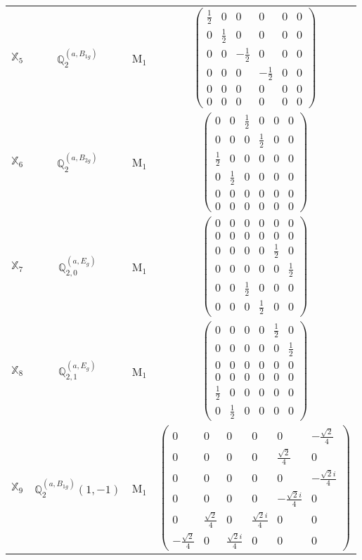 \documentclass[fleqn,10pt,landscape]{article}
\begin{document}
\begin{itemize}
\begin{center}
\begin{longtable}{c|c|c|c}
$ \mathbb{X}_{5} $ & $\mathbb{Q}_{2}^{(a,B_{1g})}$ & M$_{1}$ & $\begin{pmatrix} \frac{1}{2} & 0 & 0 & 0 & 0 & 0 \\ 0 & \frac{1}{2} & 0 & 0 & 0 & 0 \\ 0 & 0 & - \frac{1}{2} & 0 & 0 & 0 \\ 0 & 0 & 0 & - \frac{1}{2} & 0 & 0 \\ 0 & 0 & 0 & 0 & 0 & 0 \\ 0 & 0 & 0 & 0 & 0 & 0 \end{pmatrix}$ \\
$ \mathbb{X}_{6} $ & $\mathbb{Q}_{2}^{(a,B_{2g})}$ & M$_{1}$ & $\begin{pmatrix} 0 & 0 & \frac{1}{2} & 0 & 0 & 0 \\ 0 & 0 & 0 & \frac{1}{2} & 0 & 0 \\ \frac{1}{2} & 0 & 0 & 0 & 0 & 0 \\ 0 & \frac{1}{2} & 0 & 0 & 0 & 0 \\ 0 & 0 & 0 & 0 & 0 & 0 \\ 0 & 0 & 0 & 0 & 0 & 0 \end{pmatrix}$ \\
$ \mathbb{X}_{7} $ & $\mathbb{Q}_{2,0}^{(a,E_{g})}$ & M$_{1}$ & $\begin{pmatrix} 0 & 0 & 0 & 0 & 0 & 0 \\ 0 & 0 & 0 & 0 & 0 & 0 \\ 0 & 0 & 0 & 0 & \frac{1}{2} & 0 \\ 0 & 0 & 0 & 0 & 0 & \frac{1}{2} \\ 0 & 0 & \frac{1}{2} & 0 & 0 & 0 \\ 0 & 0 & 0 & \frac{1}{2} & 0 & 0 \end{pmatrix}$ \\
$ \mathbb{X}_{8} $ & $\mathbb{Q}_{2,1}^{(a,E_{g})}$ & M$_{1}$ & $\begin{pmatrix} 0 & 0 & 0 & 0 & \frac{1}{2} & 0 \\ 0 & 0 & 0 & 0 & 0 & \frac{1}{2} \\ 0 & 0 & 0 & 0 & 0 & 0 \\ 0 & 0 & 0 & 0 & 0 & 0 \\ \frac{1}{2} & 0 & 0 & 0 & 0 & 0 \\ 0 & \frac{1}{2} & 0 & 0 & 0 & 0 \end{pmatrix}$ \\
$ \mathbb{X}_{9} $ & $\mathbb{Q}_{2}^{(a,B_{1g})}(1,-1)$ & M$_{1}$ & $\begin{pmatrix} 0 & 0 & 0 & 0 & 0 & - \frac{\sqrt{2}}{4} \\ 0 & 0 & 0 & 0 & \frac{\sqrt{2}}{4} & 0 \\ 0 & 0 & 0 & 0 & 0 & - \frac{\sqrt{2} i}{4} \\ 0 & 0 & 0 & 0 & - \frac{\sqrt{2} i}{4} & 0 \\ 0 & \frac{\sqrt{2}}{4} & 0 & \frac{\sqrt{2} i}{4} & 0 & 0 \\ - \frac{\sqrt{2}}{4} & 0 & \frac{\sqrt{2} i}{4} & 0 & 0 & 0 \end{pmatrix}$ \\

\end{longtable}
\end{center}
\end{itemize}
\end{document}

